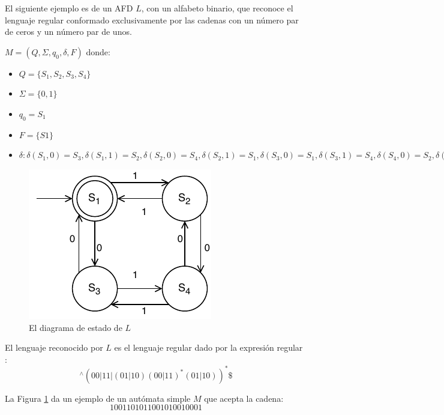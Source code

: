 \begin{example}
	El siguiente ejemplo es de un \acrshort{AFD} $L$, con un alfabeto binario, que reconoce el lenguaje regular conformado exclusivamente por las cadenas con un número par de ceros y un número par de unos.
	
	$M = (Q, \Sigma, q_{0}, \delta, F)$ donde:
	\begin{itemize}
		\item $Q = \{S_1, S_2, S_3, S_4 \}$
		\item $\Sigma = \{ 0, 1 \}$
		\item $q_0 = S_1$
		\item $F = \{ S1 \}$
		\item $\delta:  
				\delta(S_1, 0) = S_3, 
				\delta(S_1, 1) = S_2,
				\delta(S_2, 0) = S_4,
				\delta(S_2, 1) = S_1,
				\delta(S_3, 0) = S_1,
				\delta(S_3, 1) = S_4,
				\delta(S_4, 0) = S_2,
				\delta(S_4, 1) = S_3
			$
	\end{itemize}
	
	\begin{figure}[H]
		\centering
		\includegraphics[width=0.4\linewidth]{doc/FiniteAutomaton/img/AFD}
		\caption{El diagrama de estado de $L$}
		\label{fig:AFD}
	\end{figure}
	
	El lenguaje reconocido por $L$ es el lenguaje regular dado por la expresión regular \cite{stackoverflow:Biegeleisen2015}: 
	$$
	^\wedge(00|11|(01|10)(00|11)^\ast(01|10))^\ast \$
	$$
	
	La Figura \ref{fig:AFD} da un ejemplo de un autómata simple $M$ que acepta la cadena:
	$$
	1001101011001010010001
	$$

\end{example}

